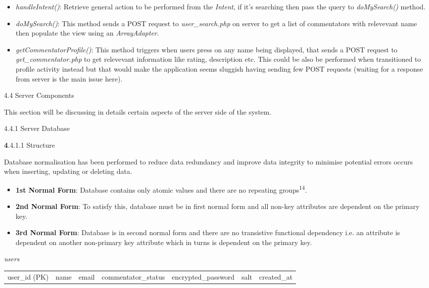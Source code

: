 \documentclass{article}
\begin{document}
\begin{flushleft}
\begin{itemize}
	\item \textit{handleIntent()}: Retrieve general action to be performed from the \textit{Intent}, if it's searching then pass the query to \textit{doMySearch()} method.
	\item \textit{doMySearch()}: This method sends a POST request to \textit{user\_search.php} on server to get a list of commentators with relevevant name then populate the view using an \textit{ArrayAdapter}.\\
	\item \textit{getCommentatorProfile()}: This method triggers when users press on any name being displayed, that sends a POST request to \textit{get\_commentator.php} to get relevevant information like rating, description etc. This could be also be performed when transitioned to profile activity instead but that would make the application seems sluggish having sending few POST requests (waiting for a response from server is the main issue here).
\end{itemize}
{\Large 4.4 Server Components}\par
This section will be discussing in details certain aspects of the server side of the system.\par
{\large 4.4.1 Server Database}\par
{\textbf 4.4.1.1 Structure}\par
Database normalisation has been performed to reduce data redundancy and improve data integrity to minimise potential errors occurs when inserting, updating or deleting data.\par
\begin{itemize}
	\item \textbf{1st Normal Form}: Database contains only atomic values and there are no repeating groups\textsuperscript{14}.
	\item \textbf{2nd Normal Form}: To satisfy this, database must be in first normal form and all non-key attributes are dependent on the primary key.
	\item \textbf{3rd Normal Form}: Database is in second normal form and there are no transistive functional dependency i.e. an attribute is dependent on another non-primary key attribute which in turns is dependent on the primary key.
\end{itemize}
\textit{users}
\begin{tabular}{| c | c | c | c | c | c | c |}
\hline
user\_id (PK) & name & email & commentator\_status & encrypted\_password & salt & created\_at\\

\end{tabular}
\end{flushleft}
\end{document}
